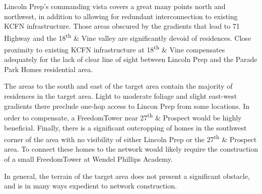  Lincoln Prep's commanding vista covers
a great many points north and northwest, in addition to allowing for redundant
interconnection to existing KCFN infrastructure.  Those areas obscured by the
gradients that lead to 71 Highway and the 18\textsuperscript{th} \& Vine valley are
significantly devoid of residences.  Close proximity to
existing KCFN infrastructure at 18\textsuperscript{th} \& Vine compensates adequately for the
lack of clear line of sight  between Lincoln Prep and the Parade Park Homes
residential area. \par
The areas to the south and east of the target area contain the
majority of residences in the target area. Light to moderate foliage and slight
east-west gradients there preclude one-hop access to Lincon Prep from some
locations. In order to compensate, a FreedomTower near 27\textsuperscript{th} \& Prospect
would be highly beneficial.
Finally, there is a significant outcropping of homes in the southwest corner of
the area with no visibility of either Lincoln Prep or the 27\textsuperscript{th} \& Prospect
area. To connect these homes to the network would likely require the
construction of a small FreedomTower at Wendel Phillips Academy. \par
In general, the terrain of the target area does not present a significant
obstacle, and is in many ways expedient to network construction. \par
